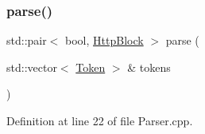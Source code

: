 \mbox{\label{classft_1_1_parser_ace9c91f641d6eb5467ce89798679b248}} 
\subsubsection{\texorpdfstring{parse()}{parse()}}
{\footnotesize\ttfamily std\+::pair$<$ bool, \hyperlink{classft_1_1_http_block}{Http\+Block} $>$ parse (\begin{DoxyParamCaption}\item[{std\+::vector$<$ \hyperlink{classft_1_1_token}{Token} $>$ \&}]{tokens }\end{DoxyParamCaption})}



Definition at line 22 of file Parser.\+cpp.


